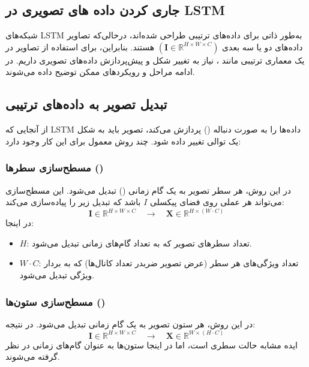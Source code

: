 \subsection{جاری کردن داده های تصویری در LSTM}


شبکه‌های LSTM به‌طور ذاتی برای داده‌های ترتیبی طراحی شده‌اند، درحالی‌که تصاویر داده‌های دو یا سه بعدی \((\mathbf{I} \in \mathbb{R}^{H \times W \times C})\) هستند. بنابراین، برای استفاده از تصاویر در یک معماری ترتیبی مانند ، نیاز به تغییر شکل و پیش‌پردازش داده‌های تصویری داریم. در ادامه مراحل و رویکردهای ممکن توضیح داده می‌شوند.

\subsection{تبدیل تصویر به داده‌های ترتیبی}

از آنجایی که LSTM داده‌ها را به صورت دنباله‌ () پردازش می‌کند، تصویر باید به شکل یک توالی تغییر داده شود. چند روش معمول برای این کار وجود دارد:

\subsubsection{مسطح‌سازی سطرها ()}

در این روش، هر سطر تصویر به یک گام زمانی () تبدیل می‌شود. این مسطح‌سازی می‌تواند هر عملی روی فضای پیکسلی $I$ باشد که تبدیل زیر را پیاده‌سازی می‌کند:
\[
\mathbf{I} \in \mathbb{R}^{H \times W \times C} \quad \rightarrow \quad \mathbf{X} \in \mathbb{R}^{H \times (W \cdot C)}
\]
در اینجا:
\begin{itemize}
	\item \(H\): تعداد سطرهای تصویر که به تعداد گام‌های زمانی تبدیل می‌شود.
	\item \(W \cdot C\): تعداد ویژگی‌های هر سطر (عرض تصویر ضربدر تعداد کانال‌ها) که به بردار ویژگی تبدیل می‌شود.
\end{itemize}

\subsubsection{مسطح‌سازی ستون‌ها ()}

در این روش، هر ستون تصویر به یک گام زمانی تبدیل می‌شود. در نتیجه:
\[
\mathbf{I} \in \mathbb{R}^{H \times W \times C} \quad \rightarrow \quad \mathbf{X} \in \mathbb{R}^{W \times (H \cdot C)}
\]
ایده مشابه حالت سطری است، اما در اینجا ستون‌ها به عنوان گام‌های زمانی در نظر گرفته می‌شوند.

